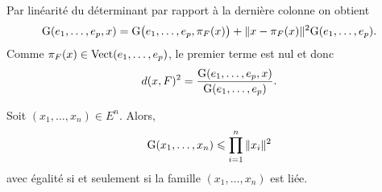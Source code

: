 \begin{preuve}
    Par linéarité du déterminant par rapport à la dernière colonne \note on obtient
    $$\mathrm{G}(e_1, \dots, e_p, x) = \mathrm{G} \big(e_1, \dots, e_p, \pi_F(x) \big) + \Vert x - \pi_F(x) \Vert^2 \mathrm{G}(e_1, \dots, e_p).$$
    Comme $\pi_F(x) \in \mathrm{Vect}(e_1, \dots, e_p)$, le premier terme est nul et donc 
    $$d(x, F)^2 = \frac{\mathrm{G}(e_1, \dots, e_p, x)}{\mathrm{G}(e_1, \dots, e_p)}.$$
\end{preuve}

\begin{corol} \label{inegalite_gram}
    Soit $(x_1, \dots, x_n) \in E^n$. Alors,
    $$\mathrm{G}(x_1, \dots, x_n) \leqslant \prod_{i=1}^n \Vert x_i \Vert^2$$
    avec égalité si et seulement si la famille $(x_1, \dots, x_n)$ est liée. 
\end{corol}

